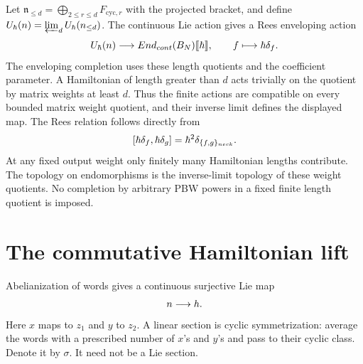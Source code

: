 Let $\mathfrak n_{\le d}=\bigoplus_{2\le r\le d}F_{\mathrm{cyc},r}$
with the projected bracket, and define
$\widehat U_\hbar(\mathfrak n)=\varprojlim_d
U_\hbar(\mathfrak n_{\le d})$.
The continuous Lie action gives a Rees enveloping action
\[
 \widehat U_\hbar(\mathfrak n)
 \longrightarrow
 \operatorname{End}_{\mathrm{cont}}
       (\widehat{\mathcal B}_N)\llbracket\hbarq\rrbracket,
 \qquad f\longmapsto\hbarq\delta_f.
\]
The enveloping completion uses these length quotients and the
coefficient parameter.  A Hamiltonian of length greater than $d$
acts trivially on the quotient by matrix weights at least $d$.
Thus the finite actions are compatible on every bounded matrix
weight quotient, and their inverse limit defines the displayed map.
The Rees relation follows directly from
\[
 [\hbarq\delta_f,\hbarq\delta_g]
 =\hbarq^2\delta_{\{f,g\}_{\mathrm{neck}}}.
\]
At any fixed output weight only finitely many Hamiltonian lengths
contribute.  The topology on endomorphisms is the inverse-limit
topology of these weight quotients.  No completion by arbitrary PBW
powers in a fixed finite length quotient is imposed.

\section{The commutative Hamiltonian lift}
Abelianization of words gives a continuous surjective Lie map
\[
 \mathfrak n\longrightarrow\h.
\]
Here $x$ maps to $z_1$ and $y$ to $z_2$.
A linear section is cyclic symmetrization: average the words with a
prescribed number of $x$'s and $y$'s and pass to their cyclic class.
Denote it by $\sigma$.  It need not be a Lie section.

